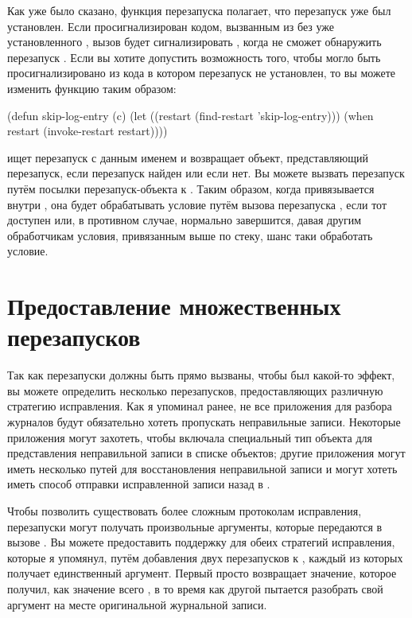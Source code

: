 Как уже было сказано, функция перезапуска  полагает, что перезапуск
 уже был установлен. Если 
просигнализирован кодом, вызванным из  без уже установленного
, вызов  будет сигнализировать
, когда не сможет обнаружить перезапуск . Если вы
хотите допустить возможность того, чтобы  могло быть
просигнализировано из кода в котором перезапуск  не установлен, то вы
можете изменить функцию  таким образом:

\begin{myverb}
(defun skip-log-entry (c)
  (let ((restart (find-restart 'skip-log-entry)))
    (when restart (invoke-restart restart))))
\end{myverb}

 ищет перезапуск с данным именем и возвращает объект, представляющий
перезапуск, если перезапуск найден или  если нет. Вы можете вызвать перезапуск
путём посылки перезапуск-объекта к . Таким образом, когда
 привязывается внутри , она будет обрабатывать
условие путём вызова перезапуска , если тот доступен или, в противном
случае, нормально завершится, давая другим обработчикам условия, привязанным выше по
стеку, шанс таки обработать условие.

\section{Предоставление множественных перезапусков}

Так как перезапуски должны быть прямо вызваны, чтобы был какой-то эффект, вы можете
определить несколько перезапусков, предоставляющих различную стратегию исправления. Как я
упоминал ранее, не все приложения для разбора журналов будут обязательно хотеть пропускать
неправильные записи. Некоторые приложения могут захотеть, чтобы 
включала специальный тип объекта для представления неправильной записи в списке
 объектов; другие приложения могут иметь несколько путей для
восстановления неправильной записи и могут хотеть иметь способ отправки исправленной
записи назад в .

Чтобы позволить существовать более сложным протоколам исправления, перезапуски могут
получать произвольные аргументы, которые передаются в вызове . Вы
можете предоставить поддержку для обеих стратегий исправления, которые я упомянул, путём
добавления двух перезапусков к , каждый из которых получает
единственный аргумент. Первый просто возвращает значение, которое получил, как значение
всего , в то время как другой пытается разобрать свой аргумент на
месте оригинальной журнальной записи.


